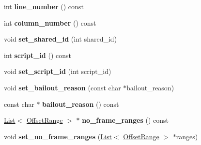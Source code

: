 \begin{DoxyCompactItemize}
\item 
\hypertarget{classv8_1_1internal_1_1_code_entry_a194b7482348ab3bf1a272a3e2cb728bd}{}int {\bfseries line\+\_\+number} () const \label{classv8_1_1internal_1_1_code_entry_a194b7482348ab3bf1a272a3e2cb728bd}

\item 
\hypertarget{classv8_1_1internal_1_1_code_entry_a2329e0ce8c4221f170a65c93556a66d9}{}int {\bfseries column\+\_\+number} () const \label{classv8_1_1internal_1_1_code_entry_a2329e0ce8c4221f170a65c93556a66d9}

\item 
\hypertarget{classv8_1_1internal_1_1_code_entry_a669e4b03d29f4f5ad1941e130c04e21a}{}void {\bfseries set\+\_\+shared\+\_\+id} (int shared\+\_\+id)\label{classv8_1_1internal_1_1_code_entry_a669e4b03d29f4f5ad1941e130c04e21a}

\item 
\hypertarget{classv8_1_1internal_1_1_code_entry_aa218e865e0ce407f5a23b0da8bbf8882}{}int {\bfseries script\+\_\+id} () const \label{classv8_1_1internal_1_1_code_entry_aa218e865e0ce407f5a23b0da8bbf8882}

\item 
\hypertarget{classv8_1_1internal_1_1_code_entry_a52937aac42b99caaa1f5956706a6565c}{}void {\bfseries set\+\_\+script\+\_\+id} (int script\+\_\+id)\label{classv8_1_1internal_1_1_code_entry_a52937aac42b99caaa1f5956706a6565c}

\item 
\hypertarget{classv8_1_1internal_1_1_code_entry_a6c5b09de8c11f72b63c95f086bddb489}{}void {\bfseries set\+\_\+bailout\+\_\+reason} (const char $\ast$bailout\+\_\+reason)\label{classv8_1_1internal_1_1_code_entry_a6c5b09de8c11f72b63c95f086bddb489}

\item 
\hypertarget{classv8_1_1internal_1_1_code_entry_a07e1931379626282df827e4a31bd337a}{}const char $\ast$ {\bfseries bailout\+\_\+reason} () const \label{classv8_1_1internal_1_1_code_entry_a07e1931379626282df827e4a31bd337a}

\item 
\hypertarget{classv8_1_1internal_1_1_code_entry_a7756d07d3094d1da7830e113a508010f}{}\hyperlink{classv8_1_1internal_1_1_list}{List}$<$ \hyperlink{structv8_1_1internal_1_1_offset_range}{Offset\+Range} $>$ $\ast$ {\bfseries no\+\_\+frame\+\_\+ranges} () const \label{classv8_1_1internal_1_1_code_entry_a7756d07d3094d1da7830e113a508010f}

\item 
\hypertarget{classv8_1_1internal_1_1_code_entry_ae9067725e466464865af267748699a3b}{}void {\bfseries set\+\_\+no\+\_\+frame\+\_\+ranges} (\hyperlink{classv8_1_1internal_1_1_list}{List}$<$ \hyperlink{structv8_1_1internal_1_1_offset_range}{Offset\+Range} $>$ $\ast$ranges)\label{classv8_1_1internal_1_1_code_entry_ae9067725e466464865af267748699a3b}


\end{DoxyCompactItemize}
